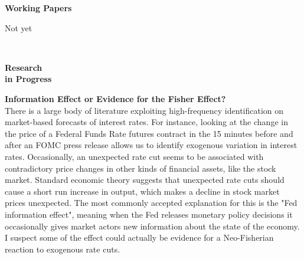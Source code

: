 \documentclass[final]{article}
\begin{document}
	\begin{minipage}[t]{.20\textwidth}
		\Large{\textbf{Working \mbox{Papers}}}\\
	\end{minipage}
	\begin{minipage}[t]{.80\textwidth}
		 Not yet
	\end{minipage}\\
	\begin{minipage}[t]{.20\textwidth}
		\Large{\textbf{Research \\in Progress}}\\
	\end{minipage}
	\begin{minipage}[t]{.80\textwidth}
		\textbf{Information Effect or Evidence for the Fisher Effect?} \\
		There is a large body of literature exploiting high-frequency identification on market-based forecasts of interest rates. For instance, looking at the change in the price of a Federal Funds Rate futures contract in the 15 minutes before and after an FOMC press release allows us to identify exogenous variation in interest rates. Occasionally, an unexpected rate cut seems to be associated with contradictory price changes in other kinds of financial assets, like the stock market. Standard economic theory suggests that unexpected rate cuts should cause a short run increase in output, which makes a decline in stock market prices unexpected. The most commonly accepted explanation for this is the "Fed information effect", meaning when the Fed releases monetary policy decisions it occasionally gives market actors new information about the state of the economy. I suspect some of the effect could actually be evidence for a Neo-Fisherian reaction to exogenous rate cuts. 
	\end{minipage}
	
	
\end{document}
